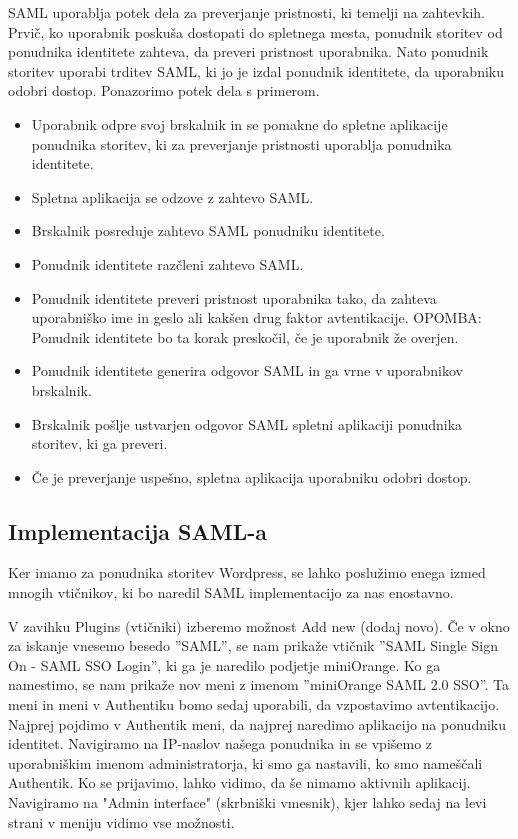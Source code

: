 \documentclass[a4paper,12pt,openright]{book}
\begin{document}
SAML uporablja potek dela za preverjanje pristnosti, ki temelji na zahtevkih. Prvič, ko uporabnik poskuša dostopati do spletnega mesta, ponudnik storitev od ponudnika identitete zahteva, da preveri pristnost uporabnika. Nato ponudnik storitev uporabi trditev SAML, ki jo je izdal ponudnik identitete, da uporabniku odobri dostop. Ponazorimo potek dela s primerom.

\begin{itemize}
    \item Uporabnik odpre svoj brskalnik in se pomakne do spletne aplikacije ponudnika storitev, ki za preverjanje pristnosti uporablja ponudnika identitete.
    \item Spletna aplikacija se odzove z zahtevo SAML.
    \item Brskalnik posreduje zahtevo SAML ponudniku identitete.
    \item Ponudnik identitete razčleni zahtevo SAML.
    \item Ponudnik identitete preveri pristnost uporabnika tako, da zahteva uporabniško ime in geslo ali kakšen drug faktor avtentikacije. OPOMBA: Ponudnik identitete bo ta korak preskočil, če je uporabnik že overjen.
    \item Ponudnik identitete generira odgovor SAML in ga vrne v uporabnikov brskalnik.
    \item Brskalnik pošlje ustvarjen odgovor SAML spletni aplikaciji ponudnika storitev, ki ga preveri.
    \item Če je preverjanje uspešno, spletna aplikacija uporabniku odobri dostop.
\end{itemize}
    
\subsection{Implementacija SAML-a}

Ker imamo za ponudnika storitev Wordpress, se lahko poslužimo enega izmed mnogih vtičnikov, ki bo naredil SAML implementacijo za nas enostavno.  

V zavihku Plugins (vtičniki) izberemo možnost Add new (dodaj novo). Če v okno za iskanje vnesemo besedo ''SAML'', se nam prikaže vtičnik  ''SAML Single Sign On - SAML SSO Login'', ki ga je naredilo podjetje miniOrange\cite{miniOrange}. 
\newline
Ko ga namestimo, se nam prikaže nov meni z imenom ''miniOrange SAML 2.0 SSO''. Ta meni in meni v Authentiku bomo sedaj uporabili, da vzpostavimo avtentikacijo. 
\newline
Najprej pojdimo v Authentik meni, da najprej naredimo aplikacijo na ponudniku identitet. Navigiramo na IP-naslov našega ponudnika in se vpišemo z uporabniškim imenom administratorja, ki smo ga nastavili, ko smo nameščali Authentik. Ko se prijavimo, lahko vidimo, da še nimamo aktivnih aplikacij. Navigiramo na "Admin interface" (skrbniški vmesnik), kjer lahko sedaj na levi strani v meniju vidimo vse možnosti.
\end{document}
